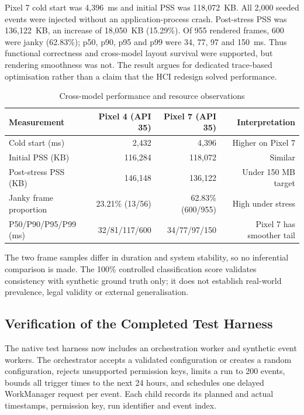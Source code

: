 Pixel 7 cold start was 4,396~ms and initial PSS was 118,072~KB. All 2,000 seeded events were injected without an application-process crash. Post-stress PSS was 136,122~KB, an increase of 18,050~KB (15.29\%). Of 955 rendered frames, 600 were janky (62.83\%); p50, p90, p95 and p99 were 34, 77, 97 and 150~ms. Thus functional correctness and cross-model layout survival were supported, but rendering smoothness was not. The result argues for dedicated trace-based optimisation rather than a claim that the HCI redesign solved performance.

\begin{table}[H]
\centering
\caption{Cross-model performance and resource observations}
\label{tab:ch5-cross-model}
\small
\begin{tabular}{lrrr}
\toprule
\textbf{Measurement} & \textbf{Pixel 4 (API 35)} & \textbf{Pixel 7 (API 35)} & \textbf{Interpretation} \\
\midrule
Cold start (ms) & 2,432 & 4,396 & Higher on Pixel 7 \\
Initial PSS (KB) & 116,284 & 118,072 & Similar \\
Post-stress PSS (KB) & 146,148 & 136,122 & Under 150 MB target \\
Janky frame proportion & 23.21\% (13/56) & 62.83\% (600/955) & High under stress \\
P50/P90/P95/P99 (ms) & 32/81/117/600 & 34/77/97/150 & Pixel 7 has smoother tail \\
\bottomrule
\end{tabular}
\end{table}

The two frame samples differ in duration and system stability, so no inferential comparison is made. The 100\% controlled classification score validates consistency with synthetic ground truth only; it does not establish real-world prevalence, legal validity or external generalisation.

\subsection{Verification of the Completed Test Harness}

The native test harness now includes an orchestration worker and synthetic event workers. The orchestrator accepts a validated configuration or creates a random configuration, rejects unsupported permission keys, limits a run to 200 events, bounds all trigger times to the next 24 hours, and schedules one delayed WorkManager request per event. Each child records its planned and actual timestamps, permission key, run identifier and event index.

